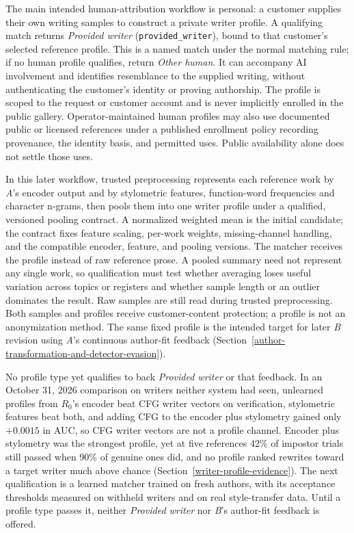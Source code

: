 The main intended human-attribution workflow is personal: a customer supplies
their own writing samples to construct a private writer profile. A qualifying
match returns \emph{Provided writer} (\texttt{provided\_writer}), bound to that
customer's selected reference profile. This is a named match under the normal
matching rule; if no human profile qualifies, return \emph{Other human}. It can accompany
AI involvement and identifies resemblance to the supplied writing, without
authenticating the customer's identity or proving authorship. The profile is
scoped to the request or customer account and is never implicitly enrolled in
the public gallery. Operator-maintained human profiles may also use documented
public or licensed references under a published enrollment policy recording
provenance, the identity basis, and permitted uses. Public availability alone
does not settle those uses.

In this later workflow, trusted preprocessing represents each reference work by
\textit{A}'s encoder output and by stylometric features, function-word
frequencies and character n-grams, then pools them into one writer profile under
a qualified, versioned pooling contract. A normalized weighted mean is the
initial candidate; the contract fixes feature scaling, per-work weights,
missing-channel handling, and the compatible encoder, feature, and pooling
versions. The
matcher receives the profile instead of raw reference prose. A pooled summary
need not represent any single work, so qualification must test whether
averaging loses useful variation across topics or registers and whether sample
length or an outlier dominates the result. Raw samples are still read during
trusted preprocessing. Both samples and profiles receive customer-content
protection; a profile is not an anonymization method. The same fixed profile is
the intended target for later \textit{B} revision using \textit{A}'s continuous
author-fit feedback (Section~\ref{author-transformation-and-detector-evasion}).

No profile type yet qualifies to back \emph{Provided writer} or that feedback.
In an October 31, 2026 comparison on writers neither system had seen, unlearned
profiles from \(R_0\)'s encoder beat CFG writer vectors on verification,
stylometric features beat both, and adding CFG to the encoder plus stylometry
gained only \(+0.0015\) in AUC, so CFG writer vectors are not a profile
channel. Encoder plus stylometry was the strongest
profile, yet at five references 42\% of impostor trials still passed when 90\%
of genuine ones did, and no profile ranked rewrites toward a target writer much
above chance (Section~\ref{writer-profile-evidence}). The next qualification is
a learned matcher trained on fresh authors, with its acceptance thresholds
measured on withheld writers and on real style-transfer data. Until a profile
type passes it, neither \emph{Provided writer} nor \textit{B}'s author-fit
feedback is offered.


